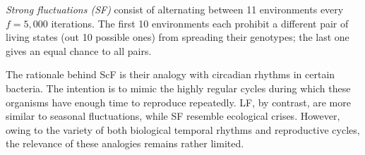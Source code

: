 \emph{Strong fluctuations (SF)} consist of alternating between 11 environments every $f=5,000$ iterations. The first 10 environments each prohibit a different pair of living states (out 10 possible ones) from spreading their genotypes; the last one gives an equal chance to all pairs.


The rationale behind ScF is their analogy with circadian rhythms in certain bacteria. The intention is to mimic the highly regular cycles during which these organisms have enough time to reproduce repeatedly. LF, by contrast, are more similar to seasonal fluctuations, while SF resemble ecological crises. However, owing to the variety of both biological temporal rhythms and reproductive cycles, the relevance of these analogies remains rather limited.

